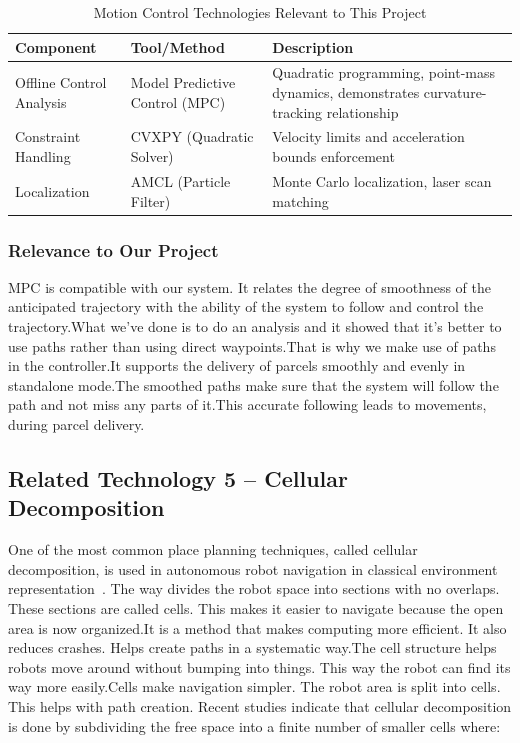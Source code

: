\begin{table}[htbp]
	\centering
	\caption{Motion Control Technologies Relevant to This Project}
	\label{tab:motion_control_tech}
	\begin{tabular}{|p{3.2cm}|p{3.2cm}|p{6.6cm}|}
		\hline
		\textbf{Component} & \textbf{Tool/Method} & \textbf{Description} \\
		\hline
		Offline Control Analysis & Model Predictive Control (MPC) & Quadratic programming, point-mass dynamics, demonstrates curvature-tracking relationship \\
		\hline
		Constraint Handling & CVXPY (Quadratic Solver) & Velocity limits and acceleration bounds enforcement \\
		\hline
		Localization & AMCL (Particle Filter) & Monte Carlo localization, laser scan matching \\
		\hline
	\end{tabular}
\end{table}

\subsubsection{Relevance to Our Project}

MPC is compatible with our system. It relates the degree of smoothness of the anticipated trajectory with the ability of the system to follow and control the trajectory.What we've done is to do an analysis and it showed that it's better to use paths rather than using direct waypoints.That is why we make use of paths in the controller.It supports the delivery of parcels smoothly and evenly in standalone mode.The smoothed paths make sure that the system will follow the path and not miss any parts of it.This accurate following leads to movements, during parcel delivery.

\subsection{Related Technology 5 -- Cellular Decomposition}

One of the most common place planning techniques, called cellular decomposition, is used in autonomous robot navigation in classical environment representation~\cite{galceran2013survey}. The way divides the robot space into sections with no overlaps. These sections are called cells. This makes it easier to navigate because the open area is now organized.It is a method that makes computing more efficient. It also reduces crashes. Helps create paths in a systematic way.The cell structure helps robots move around without bumping into things. This way the robot can find its way more easily.Cells make navigation simpler. The robot area is split into cells. This helps with path creation.
Recent studies indicate that cellular decomposition is done by subdividing the free space into a finite number of smaller cells where:


